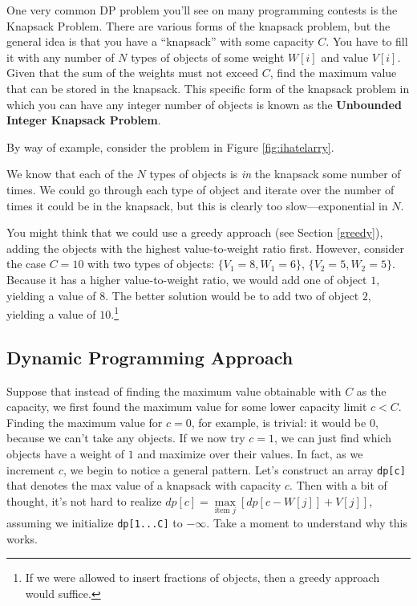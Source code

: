 One very common DP problem you'll see on many programming contests is the Knapsack Problem.  There are various forms of the knapsack problem, but the general idea is that you have a ``knapsack'' with some capacity $C$.  You have to fill it with any number of $N$ types of objects of some weight $W[i]$ and value $V[i]$.  Given that the sum of the weights must not exceed $C$, find the maximum value that can be stored in the knapsack.  This specific form of the knapsack problem in which you can have any integer number of objects is known as the \textbf{Unbounded Integer Knapsack Problem}.

By way of example, consider the problem in Figure \ref{fig:ihatelarry}.



We know that each of the $N$ types of objects is \textit{in} the knapsack some number of times.  We could go through each type of object and iterate over the number of times it could be in the knapsack, but this is clearly too slow---exponential in $N$.

You might think that we could use a greedy approach (see Section \ref{greedy}), adding the objects with the highest value-to-weight ratio first.  However, consider the case $C = 10$ with two types of objects: $\{V_1 = 8, W_1 = 6\}$, $\{V_2 = 5, W_2 = 5\}$.  Because it has a higher value-to-weight ratio, we would add one of object $1$, yielding a value of $8$. The better solution would be to add two of object $2$, yielding a value of $10$.\footnote{If we were allowed to insert fractions of objects, then a greedy approach would suffice.}


\subsection{Dynamic Programming Approach}
Suppose that instead of finding the maximum value obtainable with $C$ as the capacity, we first found the maximum value for some lower capacity limit $c < C$.  Finding the maximum value for $c=0$, for example, is trivial: it would be 0, because we can't take any objects.  If we now try $c=1$, we can just find which objects have a weight of $1$ and maximize over their values.  In fact, as we increment $c$, we begin to notice a general pattern.  Let's construct an array \verb=dp[c]= that denotes the max value of a knapsack with capacity $c$.  Then with a bit of thought, it's not hard to realize $dp[c] = \max\limits_{\text{item } j} \left[dp[c-W[j]]+V[j]\right]$, assuming we initialize \verb=dp[1...C]= to $-\infty$.  Take a moment to understand why this works.


